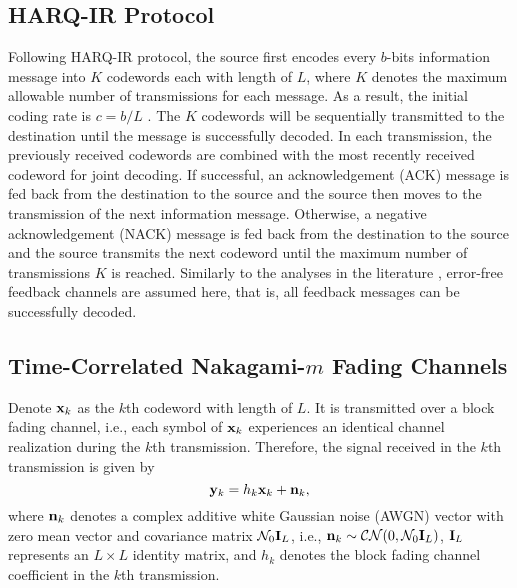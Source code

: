 \documentclass[12pt,onecolumn,draftcls]{IEEEtran}
\begin{document}
\subsection{HARQ-IR Protocol}\label{sec:harq_ir}
Following HARQ-IR protocol, the source first encodes every $b$-bits information message into $K$ codewords each with length of $L$, where $K$ denotes the maximum allowable number of transmissions for each message. As a result, the initial coding rate is $c = b/L$ \cite{wu2010performance}. The $K$ codewords will be sequentially transmitted to the destination until the message is successfully decoded. In each transmission, the previously received codewords are combined with the most recently received codeword for joint decoding. If successful, an acknowledgement (ACK) message is fed back from the destination to the source and the source then moves to the transmission of the next information message. Otherwise, a negative acknowledgement (NACK) message is fed back from the destination to the source and the source transmits the next codeword until the maximum number of transmissions $K$ is reached. Similarly to the analyses in the literature \cite{chelli2013performance,larsson2014throughput,larsson2016throughput}, error-free feedback channels are assumed here, that is, all feedback messages can be successfully decoded.
%
%
\subsection{Time-Correlated Nakagami-$m$ Fading Channels}\label{sec:corr}
Denote ${\bf x}_k$ as the $k$th codeword with length of $L$. It is transmitted over a block fading channel, i.e., each symbol of ${\bf x}_k$ experiences an identical channel realization during the $k$th transmission. Therefore, the signal received in the $k$th transmission is given by
\begin{equation}\label{eqn:sign_mod}
  {\bf y}_k = h_k {\bf x}_k + {\bf n}_k,
\end{equation}
where ${\bf n}_k$ denotes a complex additive white Gaussian noise (AWGN) vector with zero mean vector and covariance matrix $\mathcal N_0{\bf I}_{L}$, i.e., ${\bf n}_k \sim {\cal CN}(0,\mathcal N_0{{\bf I}_{L}})$, ${\bf I}_{L}$ represents an $L \times L$ identity matrix, and $h_k$ denotes the block fading channel coefficient in the $k$th transmission.
\end{document}
